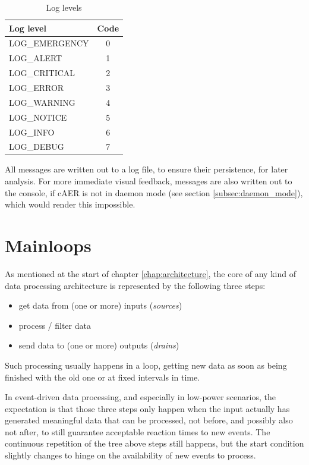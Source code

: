 \documentclass[a4paper,12pt]{report}
\begin{document}
\begin{table}[H]
\begin{center}
\caption{Log levels}
\label{tab:log_levels}
\begin{tabu} to \linewidth {|l|c|}
\hline
Log level & Code \\ \hline
LOG\_EMERGENCY & 0 \\ \hline
LOG\_ALERT & 1 \\ \hline
LOG\_CRITICAL & 2 \\ \hline
LOG\_ERROR & 3 \\ \hline
LOG\_WARNING & 4 \\ \hline
LOG\_NOTICE & 5 \\ \hline
LOG\_INFO & 6 \\ \hline
LOG\_DEBUG  & 7 \\ \hline
\end{tabu}
\end{center}
\end{table}

All messages are written out to a log file, to ensure their persistence, for later analysis.
For more immediate visual feedback, messages are also written out to the console, if cAER is not in daemon mode (see section \ref{subsec:daemon_mode}), which would render this impossible.

\section{Mainloops} \label{sec:mainloops}

As mentioned at the start of chapter \ref{chap:architecture}, the core of any kind of data processing architecture is represented by the following three steps:
\begin{itemize}
\item get data from (one or more) inputs (\emph{sources})
\item process / filter data
\item send data to (one or more) outputs (\emph{drains})
\end{itemize}
Such processing usually happens in a loop, getting new data as soon as being finished with the old one or at fixed intervals in time.

In event-driven data processing, and especially in low-power scenarios, the expectation is that those three steps only happen when the input actually has generated meaningful data that can be processed, not before, and possibly also not after, to still guarantee acceptable reaction times to new events.
The continuous repetition of the tree above steps still happens, but the start condition slightly changes to hinge on the availability of new events to process.
\end{document}
